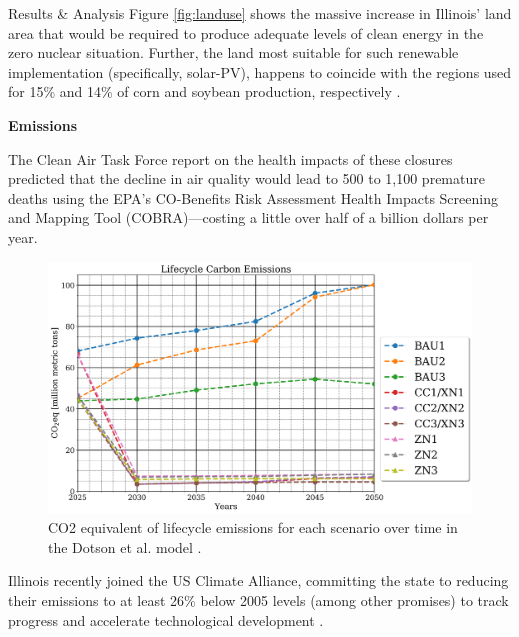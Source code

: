 \documentclass[final]{beamer}
\newlength{\onecolwid}
\newlength{\threecolwid}
\begin{document}
\begin{frame}[t]
\begin{columns}[t,totalwidth=\threecolwid]
\begin{column}{\onecolwid}
\begin{block}{Results \& Analysis}
Figure \ref{fig:landuse} shows the massive increase in Illinois' land area that would be required to produce adequate levels of clean energy in the zero nuclear situation. Further, the land most suitable for such renewable implementation (specifically, solar-PV), happens to coincide with the regions used for 15\% and 14\% of corn and soybean production, respectively \cite{schleusener}.

\vspace{0.7em}
\textbf{Emissions}
\vspace{0.7em}

The Clean Air Task Force report \cite{health} on the health impacts of these closures predicted that the decline in air quality would lead to 500 to 1,100 premature deaths using the EPA’s CO-Benefits Risk Assessment Health Impacts Screening and Mapping Tool (COBRA)---costing a little over half of a billion dollars per year. 
\begin{figure}[ht]
  \centering
  \includegraphics[scale=0.7]{co2eq_all_comparison.png}
  \caption{CO2 equivalent of lifecycle emissions for each scenario over time in the Dotson et al. model \cite{dotson}.}
  \label{fig:co2eq_time}
\end{figure}

Illinois recently joined the US Climate Alliance, committing the state to reducing their emissions to at least 26$\%$ below 2005 levels (among other promises) to track progress and accelerate technological development \cite{climate}.

\end{block}



\end{column} %


\end{columns}
\end{frame}
\end{document}
